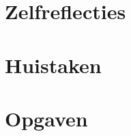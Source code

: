 \documentclass[a4paper,10pt,oneside]{book}
\begin{document}
\chapter{Zelfreflecties}







\chapter{Huistaken}



\appendix
\chapter{Opgaven}





%
\end{document}
